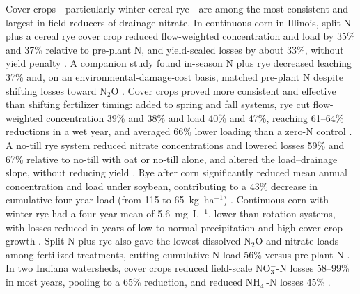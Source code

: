 \documentclass[11pt]{article}
\begin{document}
Cover crops---particularly winter cereal rye---are among the most consistent and largest in-field reducers of drainage nitrate. In continuous corn in Illinois, split N plus a cereal rye cover crop reduced flow-weighted concentration and load by 35\% and 37\% relative to pre-plant N, and yield-scaled losses by about 33\%, without yield penalty \parencite{PrezaFontes2021}. A companion study found in-season N plus rye decreased leaching 37\% and, on an environmental-damage-cost basis, matched pre-plant N despite shifting losses toward N$_2$O \parencite{PrezaFontes2023}. Cover crops proved more consistent and effective than shifting fertilizer timing: added to spring and fall systems, rye cut flow-weighted concentration 39\% and 38\% and load 40\% and 47\%, reaching 61--64\% reductions in a wet year, and averaged 66\% lower loading than a zero-N control \parencite{Ruffatti2019}. A no-till rye system reduced nitrate concentrations and lowered losses 59\% and 67\% relative to no-till with oat or no-till alone, and altered the load--drainage slope, without reducing yield \parencite{OBrien2022}. Rye after corn significantly reduced mean annual concentration and load under soybean, contributing to a 43\% decrease in cumulative four-year load (from 115 to 65~kg~ha$^{-1}$) \parencite{Gentry2024}. Continuous corn with winter rye had a four-year mean of 5.6~mg~L$^{-1}$, lower than rotation systems, with losses reduced in years of low-to-normal precipitation and high cover-crop growth \parencite{Daigh2015b}. Split N plus rye also gave the lowest dissolved N$_2$O and nitrate loads among fertilized treatments, cutting cumulative N load 56\% versus pre-plant N \parencite{Oliveira2025}. In two Indiana watersheds, cover crops reduced field-scale NO$_3^-$-N losses 58--99\% in most years, pooling to a 65\% reduction, and reduced NH$_4^+$-N losses 45\% \parencite{Vincent2025}.
\end{document}
